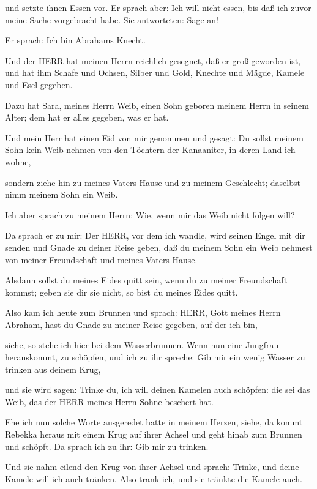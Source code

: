  und setzte ihnen Essen vor. Er sprach aber: Ich will nicht
essen, bis daß ich zuvor meine Sache vorgebracht habe. Sie antworteten:
Sage an!

 Er sprach: Ich bin Abrahams Knecht.

 Und der HERR hat meinen Herrn reichlich gesegnet, daß er
groß geworden ist, und hat ihm Schafe und Ochsen, Silber und Gold,
Knechte und Mägde, Kamele und Esel gegeben.

 Dazu hat Sara, meines Herrn Weib, einen Sohn geboren
meinem Herrn in seinem Alter; dem hat er alles gegeben, was er hat.

 Und mein Herr hat einen Eid von mir genommen und gesagt:
Du sollst meinem Sohn kein Weib nehmen von den Töchtern der Kanaaniter,
in deren Land ich wohne,

 sondern ziehe hin zu meines Vaters Hause und zu meinem
Geschlecht; daselbst nimm meinem Sohn ein Weib.

 Ich aber sprach zu meinem Herrn: Wie, wenn mir das Weib
nicht folgen will?

 Da sprach er zu mir: Der HERR, vor dem ich wandle, wird
seinen Engel mit dir senden und Gnade zu deiner Reise geben, daß du
meinem Sohn ein Weib nehmest von meiner Freundschaft und meines Vaters
Hause.

 Alsdann sollst du meines Eides quitt sein, wenn du zu
meiner Freundschaft kommst; geben sie dir sie nicht, so bist du meines
Eides quitt.

 Also kam ich heute zum Brunnen und sprach: HERR, Gott
meines Herrn Abraham, hast du Gnade zu meiner Reise gegeben, auf der ich
bin,

 siehe, so stehe ich hier bei dem Wasserbrunnen. Wenn nun
eine Jungfrau herauskommt, zu schöpfen, und ich zu ihr spreche: Gib mir
ein wenig Wasser zu trinken aus deinem Krug,

 und sie wird sagen: Trinke du, ich will deinen Kamelen
auch schöpfen: die sei das Weib, das der HERR meines Herrn Sohne
beschert hat.

 Ehe ich nun solche Worte ausgeredet hatte in meinem
Herzen, siehe, da kommt Rebekka heraus mit einem Krug auf ihrer Achsel
und geht hinab zum Brunnen und schöpft. Da sprach ich zu ihr: Gib mir zu
trinken.

 Und sie nahm eilend den Krug von ihrer Achsel und sprach:
Trinke, und deine Kamele will ich auch tränken. Also trank ich, und sie
tränkte die Kamele auch.

